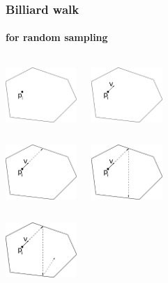 \documentclass{beamer}
\begin{document}
   \begin{frame}
      \frametitle{Billiard walk}
      \framesubtitle{for random sampling}

      \begin{columns}[t, totalwidth=7cm]

            \includegraphics[width=27mm]{../met_nets/resources/bill1.png}

            \includegraphics[width=27mm]{../met_nets/resources/bill2.png}

      \end{columns}

      \bigbreak


      \begin{columns}[t, totalwidth=7cm]

            \includegraphics[width=27mm]{../met_nets/resources/bill3.png}

            \includegraphics[width=27mm]{../met_nets/resources/bill4.png}

      \end{columns}

      \bigbreak

      \begin{columns}[t, totalwidth=7cm]

            \includegraphics[width=27mm]{../met_nets/resources/bill5.png}


\end{columns}
\end{frame}
\end{document}

